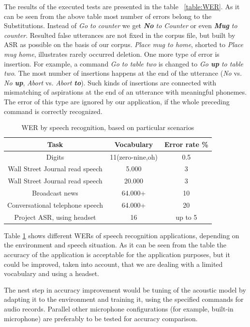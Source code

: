 \documentclass[11pt,a4paper]{report}
\begin{document}
The results of the executed tests are presented in the table ~\ref{table:WER}.
As it can be seen from the above table most number of errors belong to the 
Substitutions. Instead of \textit {Go to counter} we get \textit {\textbf{No} to
Counter} or even \textit{\textbf {Mug} to counter}.  Resulted false utterances
are not fixed in the corpus file, but built by ASR as possible on the basis of
our corpus. \textit {Place mug to home},
shorted to \textit{Place mug home}, illustrates rarely occurred deletion.  One
more type of error is insertion. For example, a command
\textit {Go to table two} is changed to \textit {Go \textbf {up} to table two}. The most number of insertions happens at the end of the utterance (\textit {No}
vs. \textit {No \textbf {up}}, \textit {Abort} vs. \textit {Abort \textbf
{to}}). Such kinds of insertions are connected with mismatching of aspirations
at the end of an utterance with meaningful phonemes. The error of this type
are ignored by our application, if the whole preceding command is correctly
recognized. 

\begin {table}[h]
\begin{center}
\begin{tabular}[h]{| c || c || c|} \hline
Task & Vocabulary & Error rate \% \\ \hline
Digits & 11(zero-nine,oh)&0.5 \\
Wall Street Journal read speech & 5.000 &3 \\
Wall Street Journal read speech & 20.000 &3 \\
Broadcast news & 64.000+ &10 \\
Conversational telephone speech & 64.000+ &20 \\
Project ASR, using headset & 16 & up to 5\\
\hline
\end{tabular}
\caption {WER by speech recognition, based on particular scenarios}
\label {table:WERS}
\end {center}
\end {table}

Table \ref{table:WERS} shows different WERs of speech
recognition applications, depending on the environment and speech situation. As
it can be seen from the table the accuracy of the application is acceptable for
the application purposes, but it could be improved, taken into account, that we
are dealing with a limited vocabulary and using a headset.  

The nest step in accuracy improvement
would be tuning of the acoustic model by adapting it to the environment and training it,
using the  specified commands for audio records. Parallel other microphone
configurations (for example, built-in microphone) are preferably to be tested
for accuracy comparison.
\end{document}
